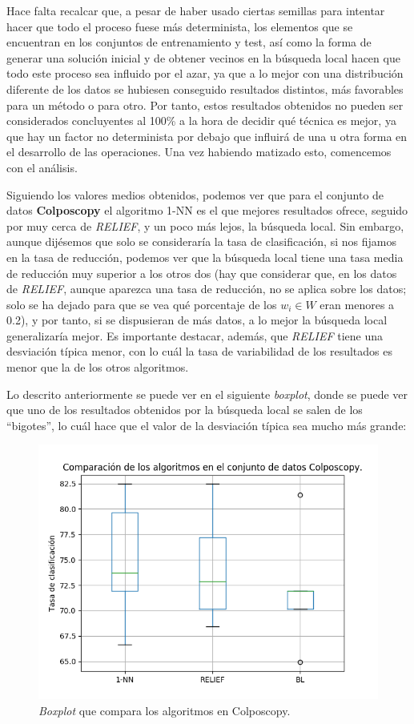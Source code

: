 \documentclass[11pt,a4paper]{article}
\begin{document}
Hace falta recalcar que, a pesar de haber usado ciertas semillas para intentar hacer que todo el proceso fuese más
determinista, los elementos que se encuentran en los conjuntos de entrenamiento y test, así como la forma de generar una
solución inicial y de obtener vecinos en la búsqueda local hacen que todo este proceso sea influido por el azar, ya que a lo
mejor con una distribución diferente de los datos se hubiesen conseguido resultados distintos, más favorables para un
método o para otro. Por tanto, estos resultados obtenidos no pueden ser considerados concluyentes al 100\% a la hora de
decidir qué técnica es mejor, ya que hay un factor no determinista por debajo que influirá de una u otra forma en el
desarrollo de las operaciones. Una vez habiendo matizado esto, comencemos con el análisis.

Siguiendo los valores medios obtenidos, podemos ver que para el conjunto de datos \textbf{Colposcopy} el algoritmo 1-NN es
el que mejores resultados ofrece, seguido por muy cerca de \textit{RELIEF}, y un poco más lejos, la búsqueda local. Sin
embargo, aunque dijésemos que solo se consideraría la tasa de clasificación, si nos fijamos en la tasa de reducción, podemos
ver que la búsqueda local tiene una tasa media de reducción muy superior a los otros dos (hay que considerar que, en los
datos de \textit{RELIEF}, aunque aparezca una tasa de reducción, no se aplica sobre los datos; solo se ha dejado para que
se vea qué porcentaje de los $w_i \in W$ eran menores a 0.2), y por tanto, si se dispusieran de más datos, a lo mejor la 
búsqueda local generalizaría mejor. Es importante destacar, además, que \textit{RELIEF} tiene una desviación típica menor,
con lo cuál la tasa de variabilidad de los resultados es menor que la de los otros algoritmos.

Lo descrito anteriormente se puede ver en el siguiente \textit{boxplot}, donde se puede ver que uno de los resultados
obtenidos por la búsqueda local se salen de los ``bigotes'', lo cuál hace que el valor de la desviación típica sea mucho
más grande:

\begin{figure}[H]
\centering
\includegraphics[scale=0.8]{img/box_colposcopy.png}
\caption{\textit{Boxplot} que compara los algoritmos en Colposcopy.}
\end{figure}
\end{document}
